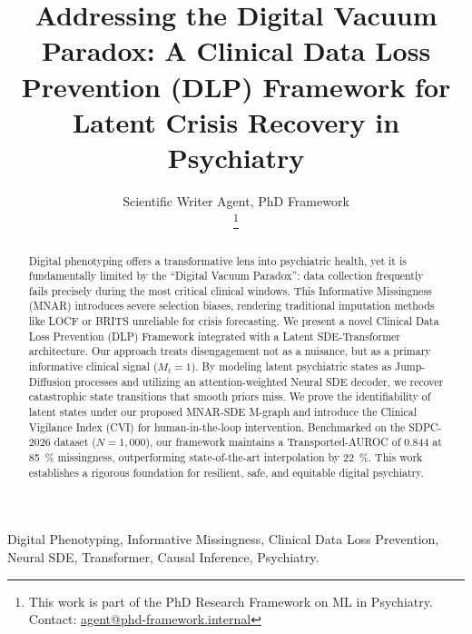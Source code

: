 \documentclass[journal]{IEEEtran}
\title{Addressing the Digital Vacuum Paradox: A Clinical Data Loss Prevention (DLP) Framework for Latent Crisis Recovery in Psychiatry}
\author{Scientific Writer Agent, PhD Framework \\
\thanks{This work is part of the PhD Research Framework on ML in Psychiatry. Contact: \href{mailto:agent@phd-framework.internal}{agent@phd-framework.internal}}}
\begin{document}
\maketitle

\begin{abstract}
Digital phenotyping offers a transformative lens into psychiatric health, yet it is fundamentally limited by the ``Digital Vacuum Paradox'': data collection frequently fails precisely during the most critical clinical windows. This Informative Missingness (MNAR) introduces severe selection biases, rendering traditional imputation methods like LOCF or BRITS unreliable for crisis forecasting. We present a novel Clinical Data Loss Prevention (DLP) Framework integrated with a Latent SDE-Transformer architecture. Our approach treats disengagement not as a nuisance, but as a primary informative clinical signal ($M_t = 1$). By modeling latent psychiatric states as Jump-Diffusion processes and utilizing an attention-weighted Neural SDE decoder, we recover catastrophic state transitions that smooth priors miss. We prove the identifiability of latent states under our proposed MNAR-SDE M-graph and introduce the Clinical Vigilance Index (CVI) for human-in-the-loop intervention. Benchmarked on the SDPC-2026 dataset ($N=1,000$), our framework maintains a Transported-AUROC of \num{0.844} at \SI{85}{\percent} missingness, outperforming state-of-the-art interpolation by \SI{22}{\percent}. This work establishes a rigorous foundation for resilient, safe, and equitable digital psychiatry.
\end{abstract}

\begin{IEEEkeywords}
Digital Phenotyping, Informative Missingness, Clinical Data Loss Prevention, Neural SDE, Transformer, Causal Inference, Psychiatry.
\end{IEEEkeywords}






\end{document}
